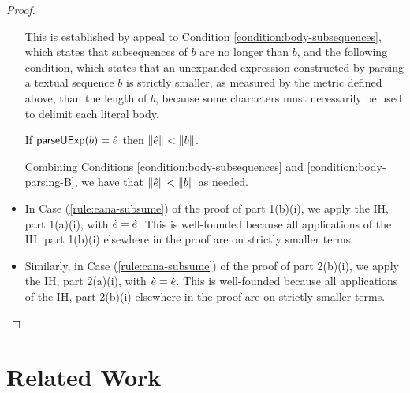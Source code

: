 \begin{proof}
\begin{itemize}
This is established by appeal to Condition \ref{condition:body-subsequences}, which states that subsequences of $b$ are no longer than $b$, and the following condition, which states that an unexpanded expression constructed by parsing a textual sequence $b$ is strictly smaller, as measured by the metric defined above, than the length of $b$, because some characters must necessarily be used to delimit each literal body.
\begin{condition}\label{condition:body-parsing-B} If $\mathsf{parseUExp}(b)={\hat e}$ then $\Vert {\hat e} \Vert < \Vert b \Vert$.\end{condition}

Combining Conditions \ref{condition:body-subsequences} and \ref{condition:body-parsing-B}, we have that $\Vert {\hat e} \Vert < \Vert b \Vert$ as needed.
\item In Case (\ref{rule:eana-subsume}) of the proof of part 1(b)(i), we apply the IH, part 1(a)(i), with ${\hat e}={\hat e}$. This is well-founded because all applications of the IH, part 1(b)(i) elsewhere in the proof are on strictly smaller terms.
\item Similarly, in Case (\ref{rule:cana-subsume}) of the proof of part 2(b)(i), we apply the IH, part 2(a)(i), with $\grave{e}=\grave{e}$. This is well-founded because all applications of the IH, part 2(b)(i) elsewhere in the proof are on strictly smaller terms.
\end{itemize}
\end{proof} 
\section{Related Work}
